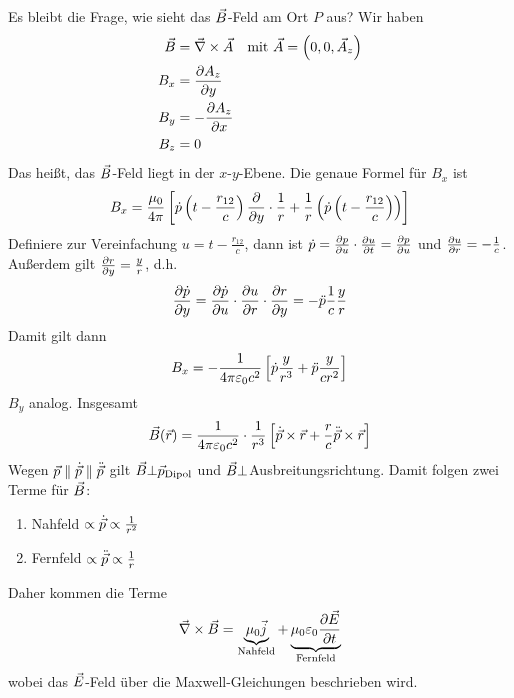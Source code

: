 Es bleibt die Frage, wie sieht das $\vecB$-Feld am Ort $P$ aus?
Wir haben
\begin{align*}
  \vecB &= \vecna\times\vecA 
  &\text{mit } \vecA = \left( 0,0,\vecA_z \right)\\
  B_x &= \dif[A_z]{y} \\
  B_y &= -\dif[A_z]{x}\\
  B_z &= 0
\end{align*}
Das heißt, das $\vecB$-Feld liegt in der $x$-$y$-Ebene.
Die genaue Formel für $B_x$ ist
\begin{gather*}
  B_x = \frac{\muo}{4\pi}\left[
    \dot{p}\left(t-\frac{r_{12}}{c}\right)\dif{y}\cdot\frac{1}{r}
      + \frac{1}{r}\left(\dot{p}\left(t-\frac{r_{12}}{c}\right)\right)
    \right]
\end{gather*}
Definiere zur Vereinfachung $u=t-\frac{r_{12}}{c}$, dann ist
$\dot{p} = \dif[p]{u}\cdot\dif[u]{t} = \dif[p]{u}$
und $\dif[u]{r} = -\frac{1}{c}$.
Außerdem gilt $\dif[r]{y}=\frac{y}{r}$, d.h.
\begin{gather*}
  \dif[\dot{p}]{y} = \dif[\dot{p}]{u}\cdot\dif[u]{r}\cdot\dif[r]{y}
  = -\ddot{p}\frac{1}{c}\frac{y}{r}
\end{gather*}
Damit gilt dann
\begin{gather*}
  B_x = -\frac{1}{4\pi\epso c^2}
  \left[ \dot{p}\frac{y}{r^3} 
    + \ddot{p} \frac{y}{cr^2} \right]
\end{gather*}
$B_y$ analog. Insgesamt
\begin{gather*}
  \vecB(\vecr) = \frac{1}{4\pi\epso c^2}\cdot
  \frac{1}{r^3}
  \left[ 
    \dot{\vecp}\times\vecr 
    + \frac{r}{c}\ddot{\vecp}\times\vecr
  \right]
\end{gather*}
Wegen $\vecp\parallel\dot{\vecp}\parallel\ddot{\vecp}$
gilt $\vecB \bot \vecp_{\text{Dipol}}$ und
$\vecB \bot$Ausbreitungsrichtung.
Damit folgen zwei Terme für $\vecB$:
\begin{enumerate}
\item Nahfeld $\propto \dot\vecp \propto \frac{1}{r^2}$
\item Fernfeld $\propto \ddot\vecp \propto \frac{1}{r}$
\end{enumerate}
Daher kommen die Terme
\begin{gather*}
  \vecna \times \vecB 
  = \underbrace{\mu_0\vecj}_{\text{Nahfeld}}
  + \underbrace{\muo\epso \dif[\vecE]{t}}_{\text{Fernfeld}}
\end{gather*}
wobei das $\vecE$-Feld über die Maxwell-Gleichungen beschrieben wird.

